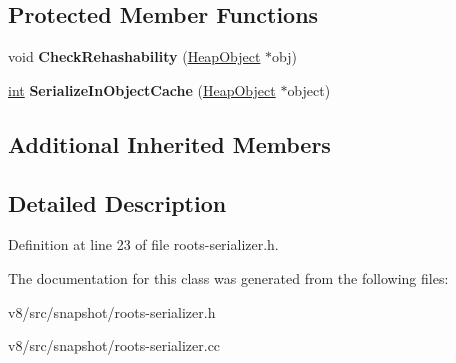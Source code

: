 \subsection*{Protected Member Functions}
\begin{DoxyCompactItemize}
\item 
\mbox{\label{classv8_1_1internal_1_1RootsSerializer_a5aa8239bc5cb5c291e7ac7e3a190e65a}} 
void {\bfseries Check\+Rehashability} (\mbox{\hyperlink{classv8_1_1internal_1_1HeapObject}{Heap\+Object}} $\ast$obj)
\item 
\mbox{\label{classv8_1_1internal_1_1RootsSerializer_a2314e83e0f6c31192abb72e5907eea6b}} 
\mbox{\hyperlink{classint}{int}} {\bfseries Serialize\+In\+Object\+Cache} (\mbox{\hyperlink{classv8_1_1internal_1_1HeapObject}{Heap\+Object}} $\ast$object)
\end{DoxyCompactItemize}
\subsection*{Additional Inherited Members}


\subsection{Detailed Description}


Definition at line 23 of file roots-\/serializer.\+h.



The documentation for this class was generated from the following files\+:\begin{DoxyCompactItemize}
\item 
v8/src/snapshot/roots-\/serializer.\+h\item 
v8/src/snapshot/roots-\/serializer.\+cc\end{DoxyCompactItemize}
